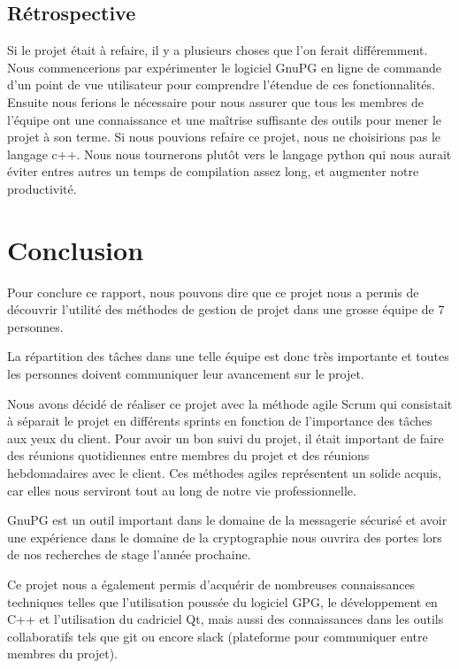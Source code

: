 \documentclass{../res/univ-projet}
\begin{document}
  \subsection{Rétrospective}
	Si le projet était à refaire, il y a plusieurs choses que l'on ferait différemment. Nous commencerions par expérimenter le logiciel GnuPG en ligne de commande d'un point de vue utilisateur pour comprendre l'étendue de ces fonctionnalités. Ensuite nous ferions le nécessaire pour nous assurer que tous les membres de l'équipe ont une connaissance et une maîtrise suffisante des outils pour mener le projet à son terme.
	Si nous pouvions refaire ce projet, nous ne choisirions pas le langage c++. Nous nous tournerons plutôt vers le langage python qui nous aurait éviter entres autres un temps de compilation assez long, et augmenter notre productivité.

\section{Conclusion}

	Pour conclure ce rapport, nous pouvons dire que ce projet nous a permis de découvrir l'utilité des méthodes de gestion de projet dans une grosse équipe de 7 personnes. 
	
	La répartition des tâches dans une telle équipe est donc très importante et toutes les personnes doivent communiquer leur avancement sur le projet. 
	
	Nous avons décidé de réaliser ce projet avec la méthode agile Scrum qui consistait à séparait le projet en différents sprints en fonction de l'importance des tâches aux yeux du client. Pour avoir un bon suivi du projet, il était important de faire des réunions quotidiennes entre membres du projet et des réunions hebdomadaires avec le client. Ces méthodes agiles représentent un solide acquis, car elles nous serviront tout au long de notre vie professionnelle.
	
	GnuPG est un outil important dans le domaine de la messagerie sécurisé et avoir une expérience dans le domaine de la cryptographie nous ouvrira des portes lors de nos recherches de stage l'année prochaine. 
	
	Ce projet nous a également permis d'acquérir de nombreuses connaissances techniques telles que l'utilisation poussée du logiciel GPG, le développement en C++ et l'utilisation du cadriciel Qt, mais aussi des connaissances dans les outils collaboratifs tels que git ou encore slack (plateforme pour communiquer entre membres du projet).
\end{document}
